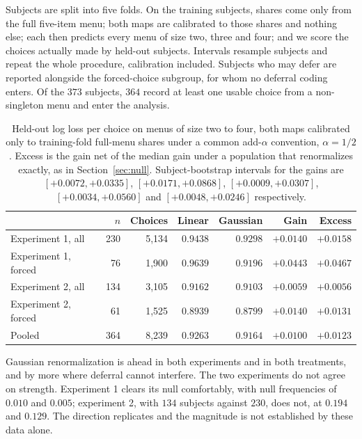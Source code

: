 \documentclass[11pt]{article}
\theoremstyle{italichead}
\begin{document}
Subjects are split into five folds. On the training subjects, shares come only from the full
five-item menu; both maps are calibrated to those shares and nothing else; each then predicts
every menu of size two, three and four; and we score the choices actually made by held-out
subjects. Intervals resample subjects and repeat the whole procedure, calibration included.
Subjects who may defer are reported alongside the forced-choice subgroup, for whom no
deferral coding enters. Of the $373$ subjects, $364$ record at least one usable choice from a
non-singleton menu and enter the analysis.

\begin{table}[htbp]
\centering
\small
\begin{tabular}{lrrrrrr}
\toprule
& $n$ & Choices & Linear & Gaussian & Gain & Excess \\
\midrule
Experiment 1, all & 230 & 5{,}134 & $0.9438$ & $0.9298$ & $+0.0140$ & $+0.0158$ \\
Experiment 1, forced & 76 & 1{,}900 & $0.9639$ & $0.9196$ & $+0.0443$ & $+0.0467$ \\
Experiment 2, all & 134 & 3{,}105 & $0.9162$ & $0.9103$ & $+0.0059$ & $+0.0056$ \\
Experiment 2, forced & 61 & 1{,}525 & $0.8939$ & $0.8799$ & $+0.0140$ & $+0.0131$ \\
\midrule
Pooled & 364 & 8{,}239 & $0.9263$ & $0.9164$ & $+0.0100$ & $+0.0123$ \\
\bottomrule
\end{tabular}
\caption{Held-out log loss per choice on menus of size two to four, both maps calibrated only
to training-fold full-menu shares under a common add-$\alpha$ convention, $\alpha = 1/2$.
Excess is the gain net of the median gain under a population that renormalizes exactly, as in
Section~\ref{sec:null}. Subject-bootstrap intervals for the gains are
$[+0.0072, +0.0335]$, $[+0.0171, +0.0868]$, $[+0.0009, +0.0307]$, $[+0.0034, +0.0560]$ and
$[+0.0048, +0.0246]$ respectively.}
\label{tab:menus}
\end{table}

Gaussian renormalization is ahead in both experiments and in both treatments, and by more where deferral
cannot interfere. The two experiments do not agree on strength. Experiment 1 clears its null
comfortably, with null frequencies of $0.010$ and $0.005$; experiment 2, with $134$ subjects
against $230$, does not, at $0.194$ and $0.129$. The direction
replicates and the magnitude is not established by these data alone.
\end{document}
